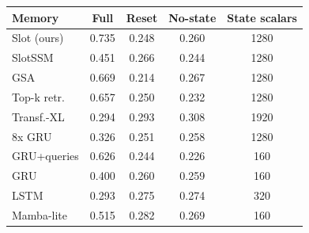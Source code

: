 \begin{tabular}{lcccc}
\toprule
Memory & Full & Reset & No-state & State scalars\\
\midrule
\rowcolor{MemCream}Slot (ours) & 0.735 & 0.248 & 0.260 & 1280\\
SlotSSM & 0.451 & 0.266 & 0.244 & 1280\\
GSA & 0.669 & 0.214 & 0.267 & 1280\\
Top-k retr. & 0.657 & 0.250 & 0.232 & 1280\\
Transf.-XL & 0.294 & 0.293 & 0.308 & 1920\\
8x GRU & 0.326 & 0.251 & 0.258 & 1280\\
GRU+queries & 0.626 & 0.244 & 0.226 & 160\\
GRU & 0.400 & 0.260 & 0.259 & 160\\
LSTM & 0.293 & 0.275 & 0.274 & 320\\
Mamba-lite & 0.515 & 0.282 & 0.269 & 160\\
\bottomrule
\end{tabular}
